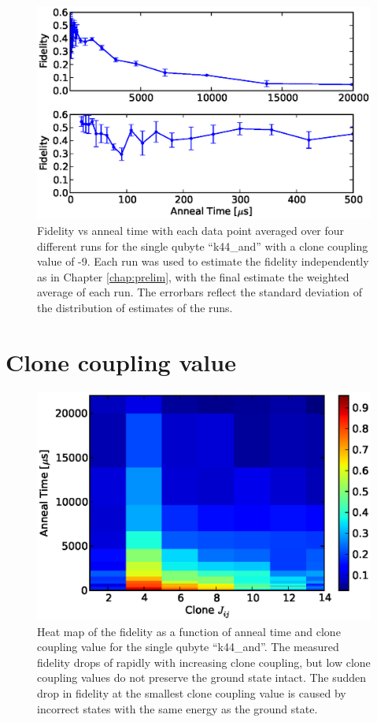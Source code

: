 \begin{figure}
	\includegraphics{img/final_single_k44.eps}
	\caption[Averaged Anneal Results]{Fidelity vs anneal time with each data point averaged over four different runs for the single qubyte ``k44\_and'' with a clone coupling value of -9.  Each run was used to estimate the fidelity independently as in Chapter \ref{chap:prelim}, with the final estimate the weighted average of each run.  The errorbars reflect the standard deviation of the distribution of estimates of the runs.}
	\label{fig:results_avg}
\end{figure}




\section{Clone coupling value}
\label{sec:coupling}

\begin{figure}
	\includegraphics{img/n_8_t_v_c.eps}
	\caption[Variable Clone Coupling Fidelity]{Heat map of the fidelity as a function of anneal time and clone coupling value for the single qubyte ``k44\_and''.  The measured fidelity drops of rapidly with increasing clone coupling, but low clone coupling values do not preserve the ground state intact.  The sudden drop in fidelity at the smallest clone coupling value is caused by incorrect states with the same energy as the ground state.}
	\label{fig:clone_coupling}
\end{figure}

